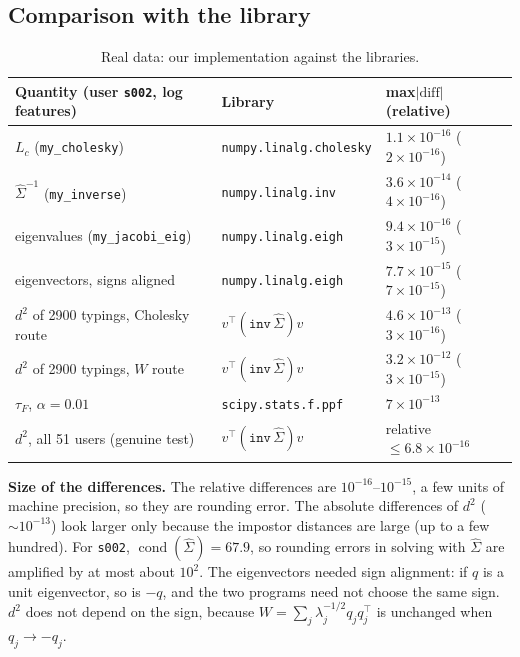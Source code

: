 \documentclass[11pt]{article}
\theoremstyle{definition}
\newcommand{\T}{^{\top}}
\begin{document}
\subsection{Comparison with the library}
\begin{table}[H]
\centering
\small
\begin{tabular}{@{}lll@{}}
\toprule
Quantity (user \texttt{s002}, log features) & Library & max$|\text{diff}|$ (relative) \\
\midrule
$L_c$ (\texttt{my\_cholesky}) & \texttt{numpy.linalg.cholesky} & $1.1\times10^{-16}$ ($2\times10^{-16}$) \\
$\hat\Sigma^{-1}$ (\texttt{my\_inverse}) & \texttt{numpy.linalg.inv} & $3.6\times10^{-14}$ ($4\times10^{-16}$) \\
eigenvalues (\texttt{my\_jacobi\_eig}) & \texttt{numpy.linalg.eigh} & $9.4\times10^{-16}$ ($3\times10^{-15}$) \\
eigenvectors, signs aligned & \texttt{numpy.linalg.eigh} & $7.7\times10^{-15}$ ($7\times10^{-15}$) \\
$d^2$ of 2900 typings, Cholesky route & $v\T(\texttt{inv}\,\hat\Sigma)v$ & $4.6\times10^{-13}$ ($3\times10^{-16}$) \\
$d^2$ of 2900 typings, $W$ route & $v\T(\texttt{inv}\,\hat\Sigma)v$ & $3.2\times10^{-12}$ ($3\times10^{-15}$) \\
$\tau_F$, $\alpha=0.01$ & \texttt{scipy.stats.f.ppf} & $7\times10^{-13}$ \\
\midrule
$d^2$, all 51 users (genuine test) & $v\T(\texttt{inv}\,\hat\Sigma)v$ & relative $\le6.8\times10^{-16}$ \\
\bottomrule
\end{tabular}
\caption{Real data: our implementation against the libraries.}
\label{tab:reallib}
\end{table}
\noindent\textbf{Size of the differences.} The relative differences are $10^{-16}$--$10^{-15}$, a few units of machine precision, so they are rounding error. The absolute differences of $d^2$ ($\sim10^{-13}$) look larger only because the impostor distances are large (up to a few hundred). For \texttt{s002}, $\operatorname{cond}(\hat\Sigma)=67.9$, so rounding errors in solving with $\hat\Sigma$ are amplified by at most about $10^2$. The eigenvectors needed sign alignment: if $q$ is a unit eigenvector, so is $-q$, and the two programs need not choose the same sign. $d^2$ does not depend on the sign, because $W=\sum_j\lambda_j^{-1/2}q_jq_j\T$ is unchanged when $q_j\to-q_j$.
\end{document}
